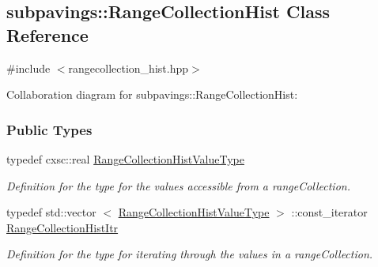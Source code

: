 \hypertarget{classsubpavings_1_1RangeCollectionHist}{\subsection{subpavings\-:\-:\-Range\-Collection\-Hist \-Class \-Reference}
\label{classsubpavings_1_1RangeCollectionHist}
}


{\ttfamily \#include $<$rangecollection\-\_\-hist.\-hpp$>$}



\-Collaboration diagram for subpavings\-:\-:\-Range\-Collection\-Hist\-:
\subsubsection*{\-Public \-Types}
\begin{DoxyCompactItemize}
\item 
typedef cxsc\-::real \hyperlink{classsubpavings_1_1RangeCollectionHist_a6a5e1b431a3cf779ca098ca63e2cff3b}{\-Range\-Collection\-Hist\-Value\-Type}
\begin{DoxyCompactList}\small\item\em \-Definition for the type for the values accessible from a range\-Collection. \end{DoxyCompactList}\item 
typedef std\-::vector\*
$<$ \hyperlink{classsubpavings_1_1RangeCollectionHist_a6a5e1b431a3cf779ca098ca63e2cff3b}{\-Range\-Collection\-Hist\-Value\-Type} $>$\*
\-::const\-\_\-iterator \hyperlink{classsubpavings_1_1RangeCollectionHist_a65d6a1cb899b673b28913a7dfb572476}{\-Range\-Collection\-Hist\-Itr}
\begin{DoxyCompactList}\small\item\em \-Definition for the type for iterating through the values in a range\-Collection. \end{DoxyCompactList}\end{DoxyCompactItemize}
